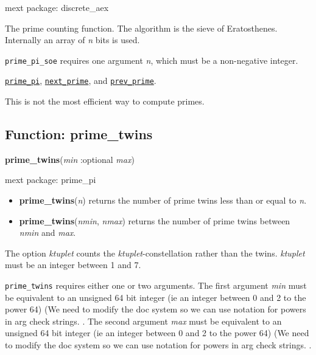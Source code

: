 \documentclass[]{article}
\begin{document}
\noindent mext package: discrete\_aex



\vspace{5 pt}
The prime counting function. The algorithm is the sieve of Eratosthenes. Internally an array of {\it n} bits is used. 

\vspace{5 pt}

   {\tt prime\_pi\_soe} requires one argument {\it n}, which must be a non-negative integer.


\vspace{5 pt}


  \hyperlink{prime_pi}{{\tt prime\_pi}}, \hyperlink{next_prime}{{\tt next\_prime}}, and \hyperlink{prev_prime}{{\tt prev\_prime}}.

\vspace{5 pt}


This is not the most efficient way to compute primes. 

\vspace{5 pt}


\subsection{Function: prime\_twins\label{sec:prime_twins}}
\hypertarget{prime_twins}{}
{\bf prime\_twins}({\it min} :optional {\it max})


\noindent mext package: prime\_pi



\vspace{5 pt}
\begin{itemize}
\item[] {\bf prime\_twins}({\it n})
  returns the number of prime twins less than or equal to {\it n}. 

\item[] {\bf prime\_twins}({\it nmin}, {\it nmax})
  returns the number of prime twins between {\it nmin} and {\it max}. 

\end{itemize}
The option {\it ktuplet} counts the {\it ktuplet}-constellation rather than the twins. {\it ktuplet} must be an integer between 1 and 7. 

\vspace{5 pt}

   {\tt prime\_twins} requires either one or two arguments.
    The first argument {\it min} must be equivalent to an unsigned 64 bit integer
 (ie an integer between 0 and 2 to the power 64)
(We need to modify the doc system so we can use notation for powers in arg check strings.
.
    The second argument {\it max} must be equivalent to an unsigned 64 bit integer
 (ie an integer between 0 and 2 to the power 64)
(We need to modify the doc system so we can use notation for powers in arg check strings.
.
\end{document}
